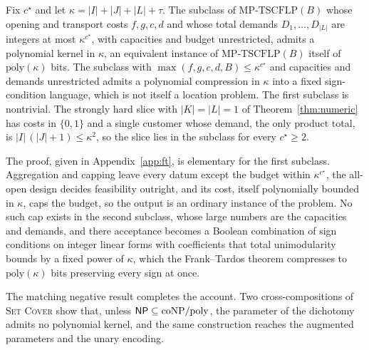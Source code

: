\begin{proposition}\label{prop:ftcompress}
Fix $c^\star$ and let $\kappa=|I|+|J|+|L|+\tau$. The subclass of
$\mathrm{MP\text{-}TSCFLP}(B)$ whose opening and transport costs
$f,g,c,d$ and whose total demands $D_1,\dots,D_{|L|}$ are integers at
most $\kappa^{c^\star}$, with capacities and budget unrestricted,
admits a polynomial kernel in $\kappa$, an equivalent instance of
$\mathrm{MP\text{-}TSCFLP}(B)$ itself of $\mathrm{poly}(\kappa)$
bits. The subclass with $\max(f,g,c,d,B)\le\kappa^{c^\star}$ and
capacities and demands unrestricted admits a
polynomial compression in $\kappa$ into a fixed sign-condition
language, which is not itself a location problem. The first subclass is nontrivial.
The strongly hard slice with $|K|=|L|=1$ of Theorem~\ref{thm:numeric}
has costs in $\{0,1\}$ and a single customer whose demand, the only
product total, is $|I|\,(|J|+1)\le\kappa^{2}$, so the slice lies in the
subclass for every $c^\star\ge 2$.
\end{proposition}
The proof, given in Appendix~\ref{app:ft}, is elementary for the first
subclass. Aggregation and capping leave every datum except the budget
within $\kappa^{c^\star}$, the all-open design decides feasibility
outright, and its cost, itself polynomially bounded in $\kappa$, caps
the budget, so the output is an ordinary instance of the problem. No
such cap exists in the second subclass, whose large numbers are the
capacities and demands, and there acceptance becomes a Boolean
combination of sign conditions on integer linear forms with
coefficients that total unimodularity bounds by a fixed power of
$\kappa$, which the
Frank--Tardos theorem compresses to
$\mathrm{poly}(\kappa)$ bits preserving every sign at once.

The matching negative result completes the account. Two cross-compositions
of \textsc{Set Cover} show that, unless
$\textsf{NP}\subseteq\mathrm{coNP}/\mathrm{poly}$, the parameter of the dichotomy
admits no polynomial kernel, and
the same construction reaches the augmented parameters and the unary
encoding.


